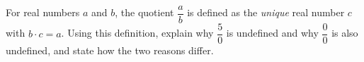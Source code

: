 For real numbers $a$ and $b$, the quotient $\dfrac {a}{b}$ is defined as the \emph{unique} real number $c$ with $b\cdot c=a$. Using this definition, explain why $\dfrac{5}{0}$ is undefined and why $\dfrac{0}{0}$ is also undefined, and state how the two reasons differ.
